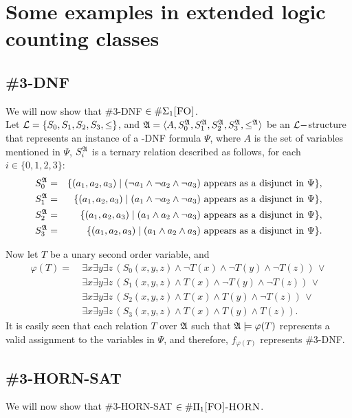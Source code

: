 \section{Some examples in extended logic counting classes}

\subsection{{\sc \#3-DNF}}
We will now show that {\sc \#3-DNF} $\in\#\Sigma_1\textsc{[FO]}$.\\

Let ${\cal L} = \{S_0,S_1,S_2,S_3,\leq\}$, and ${\frak A} = \langle A, S_0^{\frak A}, S_1^{\frak A}, S_2^{\frak A}, S_3^{\frak A}, \leq^{\frak A} \rangle$ be an ${\cal L}-$structure that represents an instance of a {-DNF} formula $\Psi$, where $A$ is the set of variables mentioned in $\Psi$, $S_i^{\frak A}$ is a ternary relation described as follows, for each $i\in\{0,1,2,3\}$:
\begin{eqnarray*}
S_0^{\frak A} &=& \{(a_1,a_2,a_3)\mid (\neg a_1 \wedge \neg a_2 \wedge \neg a_3) \mbox{ appears as a disjunct in }\Psi\},\\
S_1^{\frak A} &=& \{(a_1,a_2,a_3)\mid ( a_1 \wedge \neg a_2 \wedge \neg a_3) \mbox{ appears as a disjunct in }\Psi\},\\
S_2^{\frak A} &=& \{(a_1,a_2,a_3)\mid ( a_1 \wedge  a_2 \wedge \neg a_3) \mbox{ appears as a disjunct in }\Psi\},\\
S_3^{\frak A} &=& \{(a_1,a_2,a_3)\mid ( a_1 \wedge  a_2 \wedge  a_3) \mbox{ appears as a disjunct in }\Psi\}.
\end{eqnarray*}

Now let $T$ be a unary second order variable, and
\begin{align*}
\varphi(T) =\ &\exists x \exists y \exists z \,(S_0(x,y,z) \wedge \neg T(x) \wedge \neg T(y) \wedge \neg T(z))\,\vee \\
&\exists x \exists y \exists z \,(S_1(x,y,z) \wedge T(x) \wedge \neg T(y) \wedge \neg T(z))\,\vee \\
&\exists x \exists y \exists z \,(S_2(x,y,z) \wedge T(x) \wedge T(y) \wedge \neg T(z))\,\vee \\
&\exists x \exists y \exists z \,(S_3(x,y,z) \wedge T(x) \wedge T(y) \wedge T(z)).
\end{align*}
It is easily seen that each relation $T$ over ${\frak A}$ such that ${\frak A}\models\varphi(T)$ represents a valid assignment to the variables in $\Psi$, and therefore, $f_{\varphi(T)}$ represents {\sc \#3-DNF}.

\subsection{{\sc \#3-HORN-SAT}}
We will now show that {\sc \#3-HORN-SAT} $\in\#\Pi_1\textsc{[FO]-HORN}$.\\

